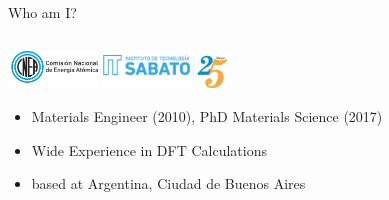 \begin{frame}{Who am I?}
\begin{columns}
\begin{column}{0.7\textwidth}
  \includegraphics[height=1cm]{./presentation/ISOLOGO-CNEA-HORIZONTAL.png}
      \hspace{1cm}
      \includegraphics[height=1cm]{./presentation/logo-isabt25.png}
      \hspace{1.5cm}

\begin{itemize}
  \item Materials Engineer (2010), PhD Materials Science (2017)
  \item Wide Experience in DFT Calculations
\item based at Argentina, Ciudad de Buenos Aires
\end{itemize}
    \end{column}
  \end{columns}
\end{frame}
